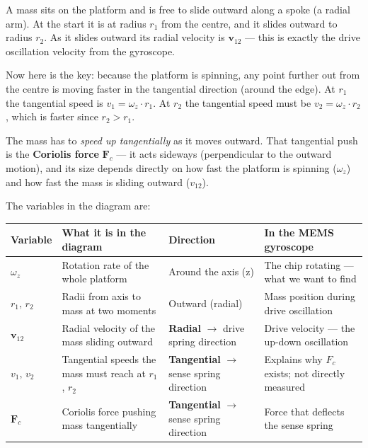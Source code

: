 \documentclass[12pt, a4paper]{article}
\begin{document}
A mass sits on the platform and is free to slide outward along a spoke
(a radial arm).
At the start it is at radius $r_1$ from the centre, and it slides
outward to radius $r_2$.
As it slides outward its radial velocity is $\mathbf{v}_{12}$ ---
this is exactly the drive oscillation velocity from the gyroscope.

Now here is the key: because the platform is spinning, any point
further out from the centre is moving faster in the tangential
direction (around the edge).
At $r_1$ the tangential speed is $v_1 = \omega_z \cdot r_1$.
At $r_2$ the tangential speed must be $v_2 = \omega_z \cdot r_2$,
which is faster since $r_2 > r_1$.

The mass has to \emph{speed up tangentially} as it moves outward.
That tangential push is the \textbf{Coriolis force} $\mathbf{F}_c$
--- it acts sideways (perpendicular to the outward motion), and its
size depends directly on how fast the platform is spinning
($\omega_z$) and how fast the mass is sliding outward ($v_{12}$).

\medskip
The variables in the diagram are:

\begin{center}
\renewcommand{\arraystretch}{1.6}
\begin{tabular}{p{2.0cm} p{4.5cm} p{3.2cm} p{4.0cm}}
  \toprule
  \textbf{Variable} & \textbf{What it is in the diagram}
  & \textbf{Direction} & \textbf{In the MEMS gyroscope} \\
  \midrule
  $\omega_z$
    & Rotation rate of the whole platform
    & Around the axis (z)
    & The chip rotating --- what we want to find \\
  $r_1,\, r_2$
    & Radii from axis to mass at two moments
    & Outward (radial)
    & Mass position during drive oscillation \\
  $\mathbf{v}_{12}$
    & Radial velocity of the mass sliding outward
    & \textbf{Radial} $\to$ drive spring direction
    & Drive velocity --- the up-down oscillation \\
  $v_1,\, v_2$
    & Tangential speeds the mass must reach at $r_1$, $r_2$
    & \textbf{Tangential} $\to$ sense spring direction
    & Explains why $F_c$ exists; not directly measured \\
  $\mathbf{F}_c$
    & Coriolis force pushing mass tangentially
    & \textbf{Tangential} $\to$ sense spring direction
    & Force that deflects the sense spring \\
  \bottomrule
\end{tabular}
\end{center}
\end{document}
